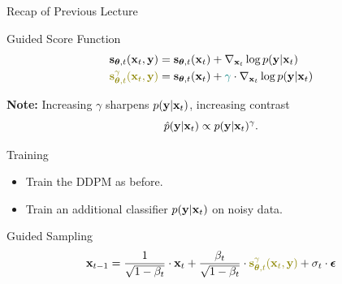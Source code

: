 \documentclass{beamer}
\begin{document}
\begin{frame}{Recap of Previous Lecture}
	\begin{block}{Guided Score Function}
		\vspace{-0.5cm}
		\begin{align*}
			\bs_{\btheta, t}(\bx_t, \by) &= \bs_{\btheta, t}(\bx_t) + \nabla_{\bx_t} \log p(\by | \bx_t) \\
			{\color{olive}\bs^{\gamma}_{\btheta, t}(\bx_t, \by)} &= \bs_{\btheta, t}(\bx_t) + {\color{teal}\gamma} \cdot \nabla_{\bx_t} \log p(\by | \bx_t)
		\end{align*}
		\vspace{-0.5cm}
	\end{block}
	\textbf{Note:} Increasing $\gamma$ sharpens $p(\mathbf{y} | \mathbf{x}_t)$, increasing contrast
	\[
		\hat{p}(\mathbf{y} | \mathbf{x}_t) \propto p(\mathbf{y} | \mathbf{x}_t)^{\gamma}.
	\]
	\vspace{-0.7cm}
	\begin{block}{Training}
		\begin{itemize}
			\item Train the DDPM as before.
			\item Train an additional classifier $p(\mathbf{y} | \mathbf{x}_t)$ on noisy data.
		\end{itemize}
		\vspace{-0.3cm}
	\end{block}
	\begin{block}{Guided Sampling}
		\vspace{-0.3cm}
		\[
			\bx_{t-1} = \frac{1}{\sqrt{1 - \beta_t}} \cdot \bx_t + \frac{\beta_t}{\sqrt{1 - \beta_t}} \cdot  {\color{olive}\bs^{\gamma}_{\btheta, t}(\bx_t, \by)} + \sigma_t \cdot \bepsilon
		\]
	\end{block}
\end{frame}
\end{document}
